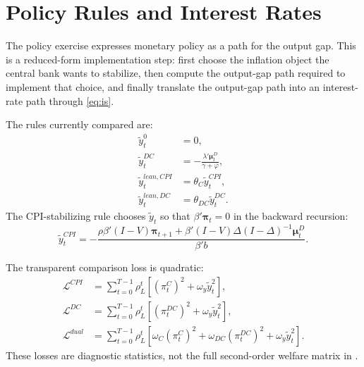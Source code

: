 \documentclass[12pt]{article}
\newcommand{\ytilde}{\tilde y}
\begin{document}
\section{Policy Rules and Interest Rates}
\label{sec:policy}

The policy exercise expresses monetary policy as a path for the output gap. This is a
reduced-form implementation step: first choose the inflation object the central bank
wants to stabilize, then compute the output-gap path required to implement that
choice, and finally translate the output-gap path into an interest-rate path through
\eqref{eq:is}.

The rules currently compared are:
\begin{align}
    \ytilde_t^{0} &= 0, \label{eq:zero-gap}\\
    \ytilde_t^{DC}
    &=
    -\frac{\lambda'\bm{\mu}^D_t}{\gamma+\varphi}, \label{eq:dc-rule}\\
    \ytilde_t^{lean,CPI}
    &=
    \theta_C \ytilde_t^{CPI}, \label{eq:lean-cpi}\\
    \ytilde_t^{lean,DC}
    &=
    \theta_{DC}\ytilde_t^{DC}. \label{eq:lean-dc}
\end{align}
The CPI-stabilizing rule chooses $\ytilde_t$ so that $\beta'\bm{\pi}_t=0$ in the
backward recursion:
\begin{equation}
    \ytilde_t^{CPI}
    =
    -
    \frac{
        \rho\beta'(I-V)\bm{\pi}_{t+1}
        +
        \beta'(I-V)\Delta(I-\Delta)^{-1}\bm{\mu}^D_t
    }{
        \beta'b
    }.
    \label{eq:cpi-rule}
\end{equation}

The transparent comparison loss is quadratic:
\begin{align}
    \mathcal{L}^{CPI}
    &=
    \sum_{t=0}^{T-1}
    \rho_L^t
    \left[
        (\pi_t^C)^2+\omega_y\ytilde_t^2
    \right],
    \label{eq:loss-cpi}\\
    \mathcal{L}^{DC}
    &=
    \sum_{t=0}^{T-1}
    \rho_L^t
    \left[
        (\pi_t^{DC})^2+\omega_y\ytilde_t^2
    \right],
    \label{eq:loss-dc}\\
    \mathcal{L}^{dual}
    &=
    \sum_{t=0}^{T-1}
    \rho_L^t
    \left[
        \omega_C(\pi_t^C)^2
        +
        \omega_{DC}(\pi_t^{DC})^2
        +
        \omega_y\ytilde_t^2
    \right].
    \label{eq:loss-dual}
\end{align}
These losses are diagnostic statistics, not the full second-order welfare matrix in
\citet{rubbo2023networks}.
\end{document}

